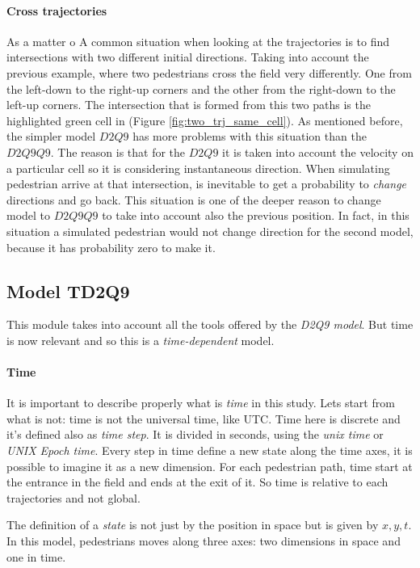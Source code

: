 \documentclass[class=article, crop=false]{standalone}
\begin{document}
\paragraph{Cross trajectories}
As a matter o
A common situation when looking at the trajectories is to find intersections with two different initial directions.
Taking into account the previous example, where two pedestrians cross the field very differently.
One from the left-down to the right-up corners and the other from the right-down to the left-up corners.
The intersection that is formed from this two paths is the highlighted green cell in (Figure \ref{fig:two_trj_same_cell}).
As mentioned before, the simpler model $D2Q9$ has more problems with this situation than the $D2Q9Q9$.
The reason is that for the $D2Q9$ it is taken into account the velocity on a particular cell so it is considering instantaneous direction. 
When simulating pedestrian arrive at that intersection, is inevitable to get a probability to \emph{change} directions and go back.
This situation is one of the deeper reason to change model to $D2Q9Q9$ to take into account also the previous position.
In fact, in this situation a simulated pedestrian would not change direction for the second model, because it has probability zero to make it.

\FloatBarrier
\subsection{Model TD2Q9}
This module takes into account all the tools offered by the \emph{D2Q9 model}.
But time is now relevant and so this is a \emph{time-dependent} model.

\paragraph{Time}
It is important to describe properly what is \emph{time} in this study.
Lets start from what is not: time is not the universal time, like UTC.
Time here is discrete and it's defined also as \emph{time step}.
It is divided in seconds, using the \emph{unix time} or \emph{UNIX Epoch time}.
Every step in time define a new state along the time axes, it is possible to imagine it as a new dimension.
For each pedestrian path, time start at the entrance in the field and ends at the exit of it.
So time is relative to each trajectories and not global.

The definition of a \emph{state} is not just by the position in space but is given by $x, y, t$.
In this model, pedestrians moves along three axes: two dimensions in space and one in time.
\end{document}
